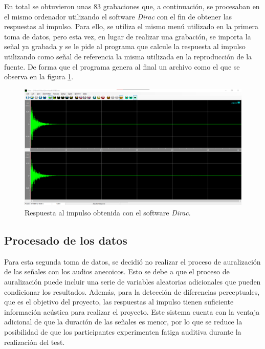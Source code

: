 \documentclass[11pt,a4paper,twoside]{book}
\begin{document}
            En total se obtuvieron unas 83 grabaciones que, a continuación, se procesaban en el mismo ordenador utilizando el software \textit{Dirac} con el fin de obtener las respuestas al impulso. Para ello, se utiliza el mismo menú utilizado en la primera toma de datos, pero esta vez, en lugar de realizar una grabación, se importa la señal ya grabada y se le pide al programa que calcule la respuesta al impulso utilizando como señal de referencia la misma utilizada en la reproducción de la fuente. De forma que el programa genera al final un archivo como el que se observa en la figura \ref{fig:IRDirac}.
            
            \begin{figure}[H]
                \includegraphics[scale=0.3]{../imagenes/IRDirac.png}
                \centering
                \caption{Respuesta al impulso obtenida con el software \textit{Dirac}.}
                \label{fig:IRDirac}
            \end{figure}
            
        \subsection{Procesado de los datos}
            Para esta segunda toma de datos, se decidió no realizar el proceso de auralización de las señales con los audios anecoicos. Esto se debe a que el proceso de auralización puede incluir una serie de variables aleatorias adicionales que pueden condicionar los resultados. Además, para la detección de diferencias perceptuales, que es el objetivo del proyecto, las respuestas al impulso tienen suficiente información acústica para realizar el proyecto. Este sistema cuenta con la ventaja adicional de que la duración de las señales es menor, por lo que se reduce la posibilidad de que los participantes experimenten fatiga auditiva durante la realización del test.
            
\end{document}
